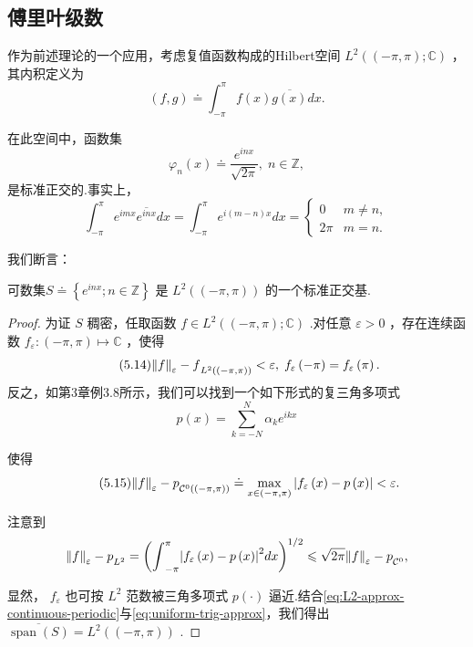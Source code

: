 \subsection{傅里叶级数}
作为前述理论的一个应用，考虑复值函数构成的Hilbert空间 ${L}^{2}\left( {\left(  {-\pi ,\pi }\right)  ;\mathbb{C}}\right)$ ，其内积定义为
\begin{equation}\tag{5.13}\label{eq:L2-inner-product-Fourier}
\left( {f,g}\right)  \doteq  {\int }_{-\pi }^{\pi }f\left( x\right) \overline{g\left( x\right) }{dx}.
\end{equation}

在此空间中，函数集
\[
{\varphi }_{n}\left( x\right)  \doteq  \frac{{e}^{inx}}{\sqrt{2\pi }},\;n \in  \mathbb{Z},
\]
是标准正交的.事实上，
\[
{\int }_{-\pi }^{\pi }{e}^{imx}\overline{{e}^{inx}}{dx} = {\int }_{-\pi }^{\pi }{e}^{i\left( {m - n}\right) x}{dx} = \begin{cases} 0 &m \neq  n, \\  {2\pi } &m = n. \end{cases}
\]

我们断言：
\begin{theorem}[$L^2((-\pi,\pi))$的标准正交基]
    可数集$S \doteq  \left\{  {{e}^{inx};n \in  \mathbb{Z}}\right\}$ 是 ${L}^{2}\left( \left(  {-\pi ,\pi }\right)  \right)$ 的一个标准正交基.
\end{theorem}
\begin{proof}
为证 $S$ 稠密，任取函数 $f \in  {L}^{2}\left( {\left(  {-\pi ,\pi }\right)  ;\mathbb{C}}\right)$ .对任意 $\varepsilon  > 0$ ，存在连续函数 ${f}_{\varepsilon } : \left(  {-\pi ,\pi }\right)   \mapsto  \mathbb{C}$ ，使得
\begin{equation}\tag{5.14}\label{eq:L2-approx-continuous-periodic}
{\norm{f}_{\varepsilon } - f}_{{L}^{2}\left( \left(  {-\pi ,\pi }\right)  \right) } < \varepsilon ,\;{f}_{\varepsilon }\left( {-\pi }\right)  = {f}_{\varepsilon }\left( \pi \right) .
\end{equation}
反之，如第3章例3.8所示，我们可以找到一个如下形式的复三角多项式
\[
p\left( x\right)  = \sum\limits_{{k =  - N}}^{N}{\alpha }_{k}{e}^{ikx}
\]

使得
\begin{equation}\tag{5.15}\label{eq:uniform-trig-approx}
{\norm{f}_{\varepsilon } - p}_{{\mathcal{C}}^{0}\left( \left(  {-\pi ,\pi }\right)  \right) } \doteq  \mathop{\max }\limits_{{x \in  \left(  {-\pi ,\pi }\right)  }}\left| {{f}_{\varepsilon }\left( x\right)  - p\left( x\right) }\right|  < \varepsilon .
\end{equation}

注意到
\[
{\norm{f}_{\varepsilon } - p}_{{L}^{2}} = {\left( {\int }_{-\pi }^{\pi }{\left| {f}_{\varepsilon }\left( x\right)  - p\left( x\right) \right| }^{2}dx\right) }^{1/2} \leqslant  \sqrt{2\pi }{\norm{f}_{\varepsilon } - p}_{{\mathcal{C}}^{0}},
\]

显然， ${f}_{\varepsilon }$ 也可按 ${L}^{2}$ 范数被三角多项式 $p\left( \cdot \right)$ 逼近.结合\eqref{eq:L2-approx-continuous-periodic}与\eqref{eq:uniform-trig-approx}，我们得出 $\overline{\operatorname{span}\left( S\right) } = {L}^{2}\left( \left(  {-\pi ,\pi }\right)  \right)$ .
\end{proof}



